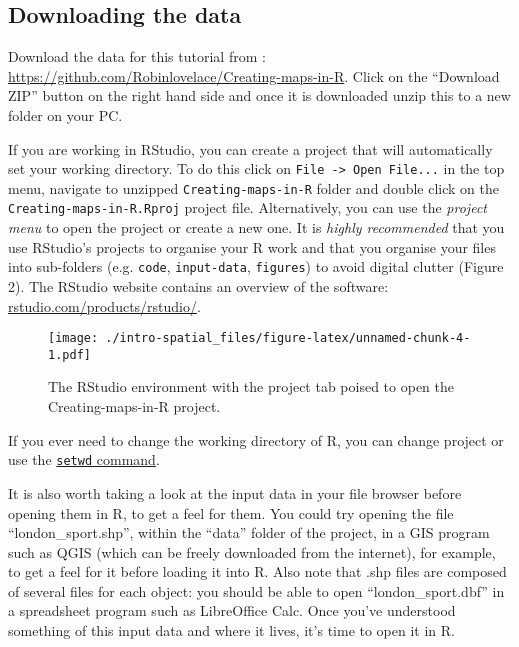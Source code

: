 \documentclass[]{article}
\begin{document}
\subsection{Downloading the data}\label{downloading-the-data}

Download the data for this tutorial from :
\href{https://github.com/Robinlovelace/Creating-maps-in-R}{\url{https://github.com/Robinlovelace/Creating-maps-in-R}}.
Click on the ``Download ZIP'' button on the right hand side and once it
is downloaded unzip this to a new folder on your PC.

If you are working in RStudio, you can create a project that will
automatically set your working directory. To do this click on
\texttt{File -\textgreater{} Open File...} in the top menu, navigate to
unzipped \texttt{Creating-maps-in-R} folder and double click on the
\texttt{Creating-maps-in-R.Rproj} project file. Alternatively, you can
use the \emph{project menu} to open the project or create a new one. It
is \emph{highly recommended} that you use RStudio's projects to organise
your R work and that you organise your files into sub-folders (e.g.
\texttt{code}, \texttt{input-data}, \texttt{figures}) to avoid digital
clutter (Figure 2). The RStudio website contains an overview of the
software:
\href{http://www.rstudio.com/products/rstudio/}{rstudio.com/products/rstudio/}.

\begin{figure}[htbp]
\centering
\texttt{[image: ./intro-spatial\_files/figure-latex/unnamed-chunk-4-1.pdf]}
\caption{The RStudio environment with the project tab poised to open the
Creating-maps-in-R project.}
\end{figure}

If you ever need to change the working directory of R, you can change
project or use the
\href{http://www.statmethods.net/interface/workspace.html}{\texttt{setwd}
command}.

It is also worth taking a look at the input data in your file browser
before opening them in R, to get a feel for them. You could try opening
the file ``london\_sport.shp'', within the ``data'' folder of the
project, in a GIS program such as QGIS (which can be freely downloaded
from the internet), for example, to get a feel for it before loading it
into R. Also note that .shp files are composed of several files for each
object: you should be able to open ``london\_sport.dbf'' in a
spreadsheet program such as LibreOffice Calc. Once you've understood
something of this input data and where it lives, it's time to open it in
R.
\end{document}
